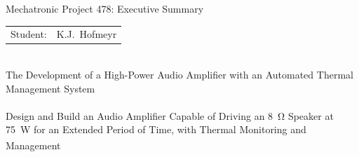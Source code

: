 
\begin{Summary}{Mechatronic Project 478: Executive Summary}

   \noindent
   \begin{tabular}{@{}ll@{}}
      \textsf{Student:}    &  K.J.\ Hofmeyr\\
   \end{tabular}

\begin{SumTable}
 \hline%
 \\
 \hline%
    The Development of a High-Power Audio Amplifier with an Automated Thermal
    Management System\\

 \hline%
 \\
 \hline%
    Design and Build an Audio Amplifier Capable of Driving an \SI{8}{\ohm} Speaker at \SI{75}{\watt_{}} for an Extended Period of Time, with Thermal Monitoring and Management \\

 \hline%
 \\
 \hline%
    

 \hline%
 \\
 \hline%
    

 \hline%
 \\
 \hline%
    

 \hline%
 \\
 \hline%


\end{SumTable}
\end{Summary}
